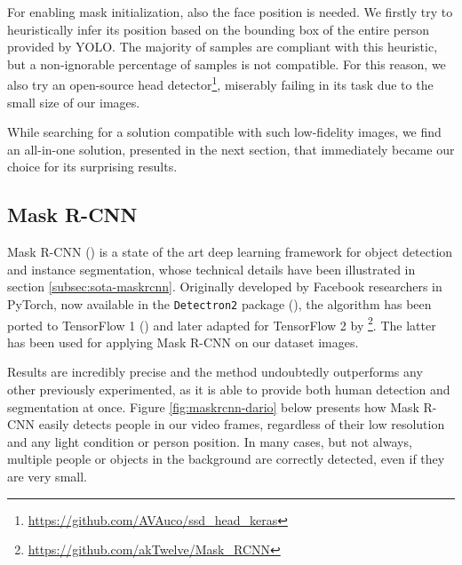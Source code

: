 \medskip

For enabling mask initialization, also the face position is needed. We firstly try to heuristically infer its position based on the bounding box of the entire person provided by YOLO. The majority of samples are compliant with this heuristic, but a non-ignorable percentage of samples is not compatible. For this reason, we also try an open-source head detector\footnote{\url{https://github.com/AVAuco/ssd_head_keras}}, miserably failing in its task due to the small size of our images.

\bigskip

While searching for a solution compatible with such low-fidelity images, we find an all-in-one solution, presented in the next section, that immediately became our choice for its surprising results.



\clearpage
\subsection{Mask R-CNN}
\label{subsec:masking-maskrcnn}

Mask R-CNN (\cite{he2018mask}) is a state of the art deep learning framework for object detection and instance segmentation, whose technical details have been illustrated in section \ref{subsec:sota-maskrcnn}. Originally developed by Facebook researchers in PyTorch\cite{pytorch}, now available in the \texttt{Detectron2} package (\cite{wu2019detectron2}), the algorithm has been ported to TensorFlow 1 (\cite{MaskRCNN_matterport}) and later adapted for TensorFlow 2 by \cite{MaskRCNN_akTwelve}\footnote{\url{https://github.com/akTwelve/Mask_RCNN}}. The latter has been used for applying Mask R-CNN on our dataset images.

\medskip

Results are incredibly precise and the method undoubtedly outperforms any other previously experimented, as it is able to provide both human detection and segmentation at once. Figure \ref{fig:maskrcnn-dario} below presents how Mask R-CNN easily detects people in our video frames, regardless of their low resolution and any light condition or person position. In many cases, but not always, multiple people or objects in the background are correctly detected, even if they are very small.

